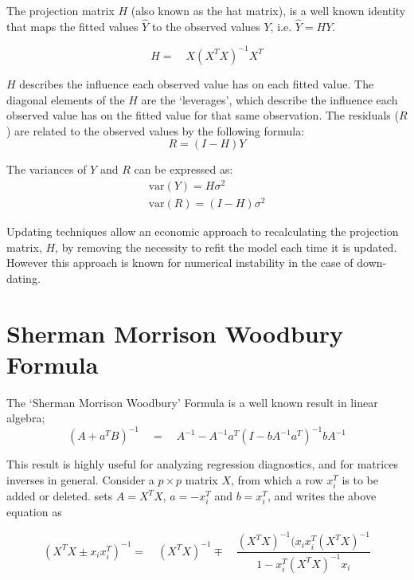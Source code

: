 \documentclass[12pt, a4paper]{article}
\begin{document}
The projection matrix $H$ (also known as the hat matrix), is a
well known identity that maps the fitted values $\hat{Y}$ to the
observed values $Y$, i.e. $\hat{Y} = HY$.


\begin{equation}
H =\quad X(X^{T}X)^{-1}X^{T}
\end{equation}


$H$ describes the influence each observed value has on each fitted
value. The diagonal elements of the $H$ are the `leverages', which
describe the influence each observed value has on the fitted value
for that same observation. The residuals ($R$) are related to the
observed values by the following formula:
\begin{equation}
R = (I-H)Y
\end{equation}


The variances of $Y$ and $R$ can be expressed as:
\begin{eqnarray}
\mbox{var}(Y) = H\sigma^{2} \nonumber\\
\mbox{var}(R) = (I-H)\sigma^{2}
\end{eqnarray}


Updating techniques allow an economic approach to recalculating
the projection matrix, $H$, by removing the necessity to refit the
model each time it is updated. However this approach is known for
numerical instability in the case of down-dating.


\section{Sherman Morrison Woodbury Formula} %


The `Sherman Morrison Woodbury' Formula is a well known result in
linear algebra;
\begin{equation}
(A+a^{T}B)^{-1} \quad = \quad A^{-1}-
A^{-1}a^{T}(I-bA^{-1}a^{T})^{-1}bA^{-1}
\end{equation}


This result is highly useful for analyzing regression diagnostics,
and for matrices inverses in general. Consider a $p \times p$
matrix $X$, from which a row $x_{i}^{T}$ is to be added or
deleted. \citet{CookWeisberg} sets $A = X^{T}X$, $a=-x_{i}^{T}$
and $b=x_{i}^{T}$, and writes the above equation as


\begin{equation}
(X^{T}X \pm x_{i}x_{i}^{T})^{-1} = \quad(X^{T}X )^{-1} \mp \quad
\frac{(X^{T}X)^{-1}(x_{i}x_{i}^{T}(X^{T}X)^{-1}}{1-x_{i}^{T}(X^{T}X)^{-1}x_{i}}
\end{equation}
\end{document}
